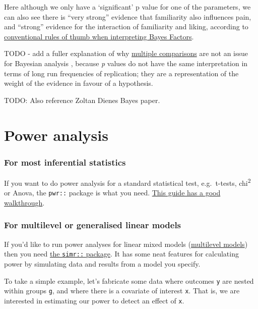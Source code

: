 \documentclass[]{article}
\theoremstyle{definition}
\theoremstyle{definition}
\theoremstyle{definition}
\theoremstyle{remark}
\begin{document}
Here although we only have a `significant' p value for one of the
parameters, we can also see there is ``very strong'' evidence that
familiarity also influences pain, and ``strong'' evidence for the
interaction of familiarity and liking, according to
\href{https://en.wikipedia.org/wiki/Bayes_factor\#Interpretation}{conventional
rules of thumb when interpreting Bayes Factors}.

TODO - add a fuller explanation of why
\protect\hyperlink{mutiple-comparisons}{multiple comparisons} are not an
issue for Bayesian analysis \citep{gelman2012we}, because \emph{p}
values do not have the same interpretation in terms of long run
frequencies of replication; they are a representation of the weight of
the evidence in favour of a hypothesis.

TODO: Also reference Zoltan Dienes Bayes paper.

\section{Power analysis}\label{power-analysis}

\subsubsection*{For most inferential
statistics}\label{for-most-inferential-statistics}

If you want to do power analysis for a standard statistical test,
e.g.~t-tests, chi\textsuperscript{2} or Anova, the \texttt{pwr::}
package is what you need.
\href{http://www.statmethods.net/stats/power.html}{This guide has a good
walkthrough}.

\subsubsection*{For multilevel or generalised linear
models}\label{for-multilevel-or-generalised-linear-models}

If you'd like to run power analyses for linear mixed models
(\protect\hyperlink{multilevel-models}{multilevel models}) then you need
\href{http://onlinelibrary.wiley.com/doi/10.1111/2041-210X.12504/full}{the
\texttt{simr::} package}. It has some neat features for calculating
power by simulating data and results from a model you specify.

To take a simple example, let's fabricate some data where outcomes
\texttt{y} are nested within groups \texttt{g}, and where there is a
covariate of interest \texttt{x}. That is, we are interested in
estimating our power to detect an effect of \texttt{x}.
\end{document}
